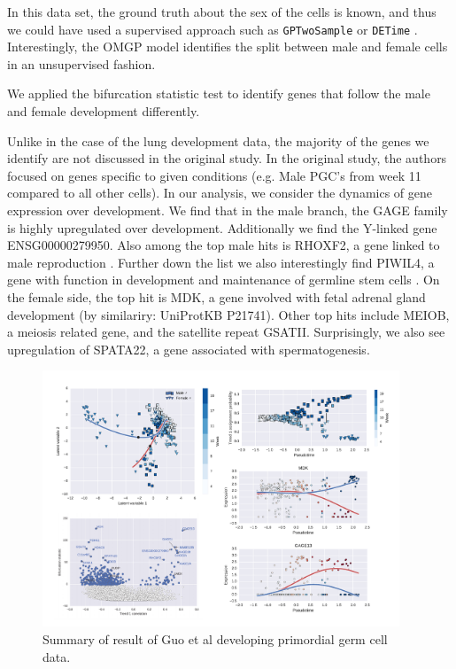 In this data set, the ground truth about the sex of the cells is known, and thus we could have used a supervised approach such as \verb|GPTwoSample| \cite{Stegle2010-cb} or \verb|DETime| \cite{Yang2016-wq}. Interestingly, the OMGP model identifies the split between male and female cells in an unsupervised fashion.

We applied the bifurcation statistic test to identify genes that follow the male and female development differently.

Unlike in the case of the lung development data, the majority of the genes we identify are not discussed in the original study. In the original study, the authors focused on genes specific to given conditions (e.g. Male PGC's from week 11 compared to all other cells). In our analysis, we consider the dynamics of gene expression over development. We find that in the male branch, the GAGE family is highly upregulated over development. Additionally we find the Y-linked gene ENSG00000279950. Also among the top male hits is RHOXF2, a gene linked to male reproduction \cite{Niu2011-xq}. Further down the list we also interestingly find PIWIL4, a gene with function in development and maintenance of germline stem cells \cite{Sasaki2003-oy}. On the female side, the top hit is MDK, a gene involved with fetal adrenal gland development (by similariry: UniProtKB P21741). Other top hits include MEIOB, a meiosis related gene, and the satellite repeat GSATII. Surprisingly, we also see upregulation of SPATA22, a gene associated with spermatogenesis.

\begin{figure}
    \centering
    \includegraphics[width=0.95\textwidth]{"fig-guo"}
    \caption{Summary of  result of Guo et al developing primordial germ cell data.}
    \label{fig:guo}
\end{figure}

